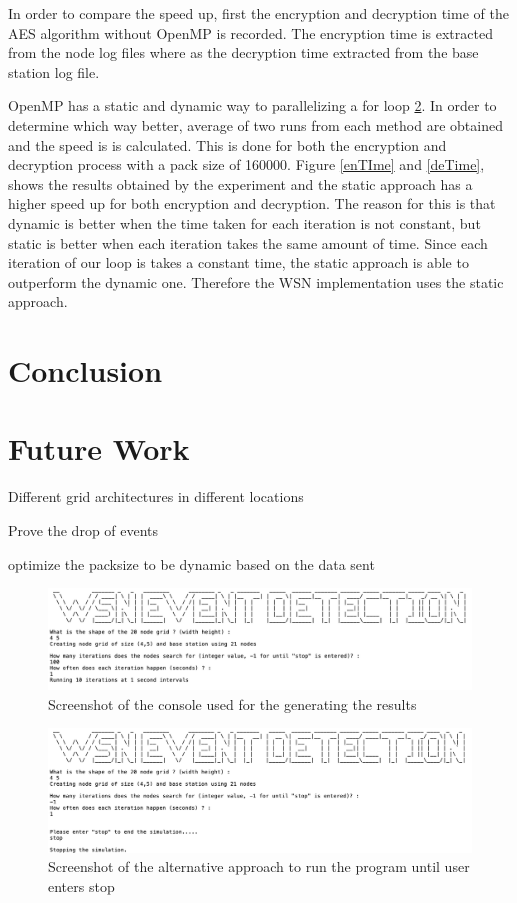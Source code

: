 \documentclass[conference]{IEEEtran}
\begin{document}
	In order to compare the speed up, first the encryption and decryption time of the AES algorithm without OpenMP is recorded. The encryption time is extracted from the node log files where as the decryption time extracted from the base station log file. 
	
	OpenMP has a static and dynamic way to parallelizing a for loop \ref{}. In order to determine which way better, average of two runs from each method are obtained and the speed is is calculated. This is done for both the encryption and decryption process with a pack size of 160000. Figure \ref{enTIme} and \ref{deTime}, shows the results obtained by the experiment and the static approach has a higher speed up for both encryption and decryption. The reason for this is that dynamic is better when the time taken for each iteration is not constant, but static is better when each iteration takes the same amount of time. Since each iteration of our loop is takes a constant time, the static approach is able to outperform the dynamic one. Therefore the WSN implementation uses the static approach.

	
	\section{Conclusion}
	
	\section{Future Work}
	
	Different grid architectures in different locations
	
	Prove the drop of events
	
	optimize the packsize to be dynamic based on the data sent
	
	

	



	\newpage
	\onecolumn
	\appendix
	
	
\begin{figure}[h]
	\centering
	\includegraphics[width=6in,keepaspectratio]{console1}
	\caption{Screenshot of the console used for the generating the results}
	\label{screen 1}
\end{figure}

\begin{figure}[h]
	\centering
	\includegraphics[width=6in,keepaspectratio]{console2}
	\caption{Screenshot of the alternative approach to run the program until user enters stop}
	\label{screen 2}
\end{figure}
\end{document}
